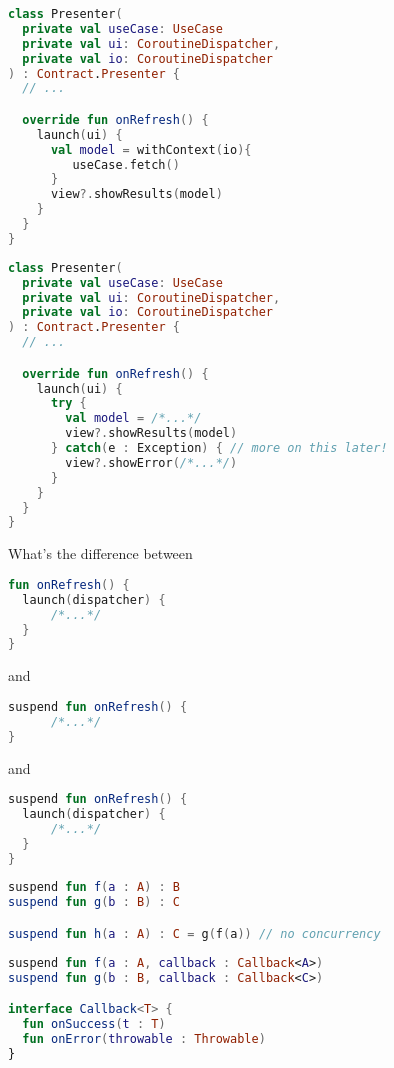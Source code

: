 \documentclass[10pt]{beamer}
\begin{document}
\begin{frame}[fragile]
\begin{lstlisting}[language=Kotlin, basicstyle=\ttfamily]
class Presenter(
  private val useCase: UseCase
  private val ui: CoroutineDispatcher,
  private val io: CoroutineDispatcher
) : Contract.Presenter {
  // ...

  override fun onRefresh() {
    launch(ui) {
      val model = withContext(io){
         useCase.fetch()
      }
      view?.showResults(model)
    }
  }
}
\end{lstlisting}
\end{frame}

\begin{frame}[fragile]
\begin{lstlisting}[language=Kotlin, basicstyle=\ttfamily]
class Presenter(
  private val useCase: UseCase
  private val ui: CoroutineDispatcher,
  private val io: CoroutineDispatcher
) : Contract.Presenter {
  // ...

  override fun onRefresh() {
    launch(ui) { 
      try {
        val model = /*...*/
        view?.showResults(model)
      } catch(e : Exception) { // more on this later!
        view?.showError(/*...*/)
      }
    }
  }
}
\end{lstlisting}
\end{frame}

\begin{frame}[fragile]
What's the difference between 
\begin{lstlisting}[language=Kotlin, basicstyle=\ttfamily]
fun onRefresh() { 
  launch(dispatcher) { 
      /*...*/
  }
}
\end{lstlisting}
and
\begin{lstlisting}[language=Kotlin, basicstyle=\ttfamily]
suspend fun onRefresh() { 
      /*...*/
}
\end{lstlisting}
and 
\begin{lstlisting}[language=Kotlin, basicstyle=\ttfamily]
suspend fun onRefresh() { 
  launch(dispatcher) { 
      /*...*/
  }
}
\end{lstlisting}
\end{frame}


\begin{frame}[fragile]
\begin{lstlisting}[language=Kotlin, basicstyle=\ttfamily]
suspend fun f(a : A) : B 
suspend fun g(b : B) : C 

suspend fun h(a : A) : C = g(f(a)) // no concurrency
\end{lstlisting}
\end{frame}
\begin{frame}[fragile]
\begin{lstlisting}[language=Kotlin, basicstyle=\ttfamily]
suspend fun f(a : A, callback : Callback<A>)
suspend fun g(b : B, callback : Callback<C>) 

interface Callback<T> {
  fun onSuccess(t : T)
  fun onError(throwable : Throwable) 
}
\end{lstlisting}
\end{frame}
\end{document}
